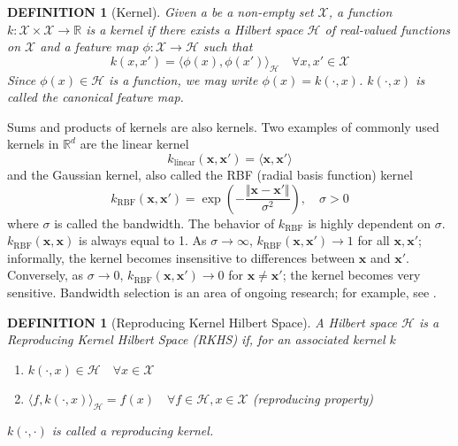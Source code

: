 \documentclass[a4paper,11pt]{article}
\newtheorem{definition}[theorem]{DEFINITION}
\begin{document}
\begin{definition}[Kernel]
    Given a be a non-empty set $\mathcal{X}$, a function $k: \mathcal{X} \times \mathcal{X} \rightarrow \mathbb{R}$ is a kernel if there exists a Hilbert space $\mathcal{H}$ of real-valued functions on $\mathcal{X}$ and a feature map $\phi: \mathcal{X} \rightarrow \mathcal{H}$ such that $$ k(x, x') = \langle \phi(x), \phi(x') \rangle_{\mathcal{H}} \quad \forall x, x' \in \mathcal{X} $$
    Since $\phi(x) \in \mathcal{H}$ is a function, we may write $\phi(x)=k(\cdot, x)$. $k(\cdot, x)$ is called the canonical feature map.
\end{definition}
Sums and products of kernels are also kernels. Two examples of commonly used kernels in $\mathbb{R}^{d}$ are the linear kernel
\begin{equation}
    k_{\text{linear}}(\mathbf{x}, \mathbf{x}') = \langle \mathbf{x}, \mathbf{x}' \rangle
    \label{eq:linear_kernel}
\end{equation}
and the Gaussian kernel, also called the RBF (radial basis function) kernel
\begin{equation}
    k_{\text{RBF}}(\mathbf{x}, \mathbf{x}') = \exp{\left( -\frac{\Vert \mathbf{x}-\mathbf{x}' \Vert}{\sigma^{2}} \right)}, \quad \sigma > 0
    \label{eq:gaussian_kernel}
\end{equation}
where $\sigma$ is called the bandwidth. The behavior of $k_{\text{RBF}}$ is highly dependent on $\sigma$. $k_{\text{RBF}}(\mathbf{x}, \mathbf{x})$ is always equal to 1. As $\sigma\rightarrow\infty$, $k_{\text{RBF}}(\mathbf{x}, \mathbf{x}') \rightarrow 1$ for all $\mathbf{x}, \mathbf{x}'$; informally, the kernel becomes insensitive to differences between $\mathbf{x}$ and $\mathbf{x}'$. Conversely, as $\sigma\rightarrow 0$, $k_{\text{RBF}}(\mathbf{x}, \mathbf{x}') \rightarrow 0$ for $\mathbf{x} \neq \mathbf{x}'$; the kernel becomes very sensitive. Bandwidth selection is an area of ongoing research; for example, see \cite{sutherland_generative_2019}.

\begin{definition}[Reproducing Kernel Hilbert Space]
    A Hilbert space $\mathcal{H}$ is a Reproducing Kernel Hilbert Space (RKHS) if, for an associated kernel $k$
    \begin{enumerate}
        \item $k(\cdot, x) \in \mathcal{H} \quad \forall x \in \mathcal{X}$
        \item $\langle f, k(\cdot, x) \rangle_{\mathcal{H}} = f(x) \quad \forall f \in \mathcal{H}, x \in \mathcal{X} $ (reproducing property)
    \end{enumerate}
    $k(\cdot, \cdot)$ is called a reproducing kernel.
\end{definition}
\end{document}
